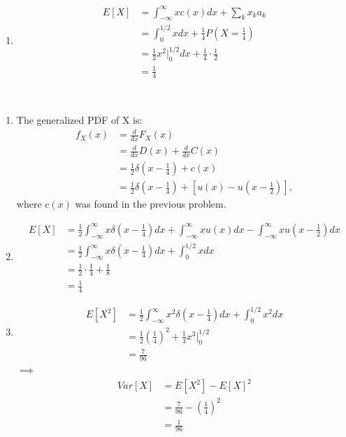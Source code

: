 \begin{problem}{13}
\begin{enumerate}
\item

\begin{align*}
E[X] &= \int_{-\infty}^{\infty}x c(x) dx+\sum_{k}x_k a_k \\
& = \int_0^{1/2}x dx+\frac{1}{4}P\left(X=\frac{1}{4}\right) \\
& = \frac{1}{2}x^2\Big|_0^{1/2} dx+\frac{1}{4}\cdot \frac{1}{2} \\
& = \frac{1}{4}
\end{align*}

\end{enumerate}


\end{problem}


\begin{problem}{14}$ $


\begin{enumerate}
\item The generalized PDF of X is:
\begin{align*}
f_X(x) &= \frac{d}{dx}F_X(x) \\
& =   \frac{d}{dx}D(x)+\frac{d}{dx}C(x) \\
& = \frac{1}{2}\delta \left(x-\frac{1}{4}\right)+c(x) \\
& =  \frac{1}{2}\delta \left(x-\frac{1}{4}\right)+\left[u(x)-u\left(x-\frac{1}{2}\right)\right],
\end{align*}
where $c(x)$ was found in the previous problem.

\item
\begin{align*}
E[X] &= \frac{1}{2}\int_{-\infty}^{\infty}x\delta \left(x-\frac{1}{4}\right)dx + \int_{-\infty}^{\infty}xu(x)dx-\int_{-\infty}^{\infty}xu\left(x-\frac{1}{2}\right)dx \\
&= \frac{1}{2}\int_{-\infty}^{\infty}x\delta \left(x-\frac{1}{4}\right)dx + \int_0^{1/2}x dx\\
& = \frac{1}{2}\cdot\frac{1}{4}+\frac{1}{8} \\
& = \frac{1}{4}
\end{align*}


\item
\begin{align*}
E[X^2]&=\frac{1}{2}\int_{-\infty}^{\infty}x^2\delta \left(x-\frac{1}{4}\right)dx + \int_{0}^{1/2}x^2dx \\
& = \frac{1}{2} \left(\frac{1}{4} \right)^2+\frac{1}{3}x^3\Big|_0^{1/2} \\
& = \frac{7}{96}
\end{align*}
$\implies$
\begin{align*}
Var[X]&=E[X^2] - E[X]^2 \\
& =  \frac{7}{96} - \left(\frac{1}{4}\right)^2 \\
& = \frac{1}{96}
\end{align*}



\end{enumerate}

\end{problem}

